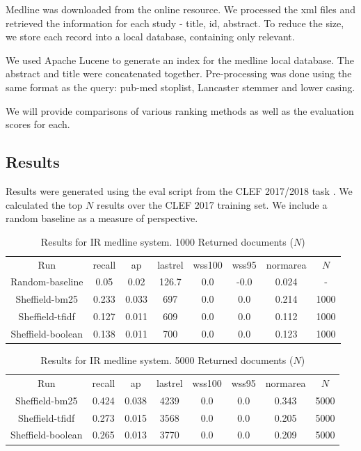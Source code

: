 Medline was downloaded from the online resource. We processed the xml files and retrieved the  information for each study - title, id, abstract. To reduce the size, we store each record into a local database, containing only relevant.

We used Apache Lucene to generate an index for the medline local database. The abstract and title were concatenated together. Pre-processing was done using the same format as the query: pub-med stoplist, Lancaster stemmer and lower casing. 

We will provide comparisons of various ranking methods as well as the evaluation scores for each. 

\subsection{Results}

Results were generated using the eval script from the CLEF 2017/2018 task \cite{Kanoulas12017}. We calculated the top $N$ results over the CLEF 2017 training set. We include a random baseline as a measure of perspective.


\begin{table}[H]
\centering
\begin{tabular}{|c|c|c|c|c|c|c|c|} 
 \hline
 Run & recall &  ap & lastrel & wss100 & wss95 & normarea & $N$ \\ 
 Random-baseline & 0.05 &0.02 & 126.7 &0.0 &-0.0 & 0.024 & - \\
  Sheffield-bm25 & 0.233 &0.033 & 697 &0.0 &0.0 & 0.214 & 1000 \\
  Sheffield-tfidf & 0.127 &0.011 & 609 &0.0 &0.0 & 0.112 & 1000 \\
  Sheffield-boolean & 0.138 &0.011 & 700 &0.0 &0.0 & 0.123 & 1000 \\
 \hline
\end{tabular}
\caption{Results for IR medline system. 1000 Returned documents ($N$)}
\end{table}


\begin{table}[H]
\centering
\begin{tabular}{|c|c|c|c|c|c|c|c|} 
 \hline
 Run & recall &  ap & lastrel & wss100 & wss95 & normarea & $N$ \\ 
  Sheffield-bm25 & 0.424 &0.038 & 4239 &0.0 &0.0 & 0.343 & 5000 \\
  Sheffield-tfidf & 0.273 &0.015 & 3568 &0.0 &0.0 & 0.205 & 5000 \\
  Sheffield-boolean & 0.265 &0.013 & 3770 &0.0 &0.0 & 0.209 & 5000 \\
 \hline
\end{tabular}
\caption{Results for IR medline system. 5000 Returned documents ($N$)}
\end{table}

